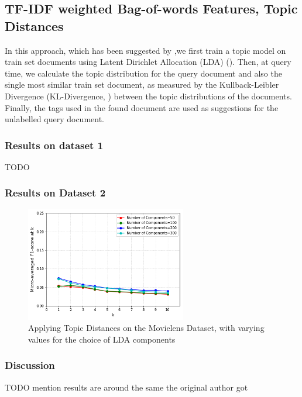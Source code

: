 \subsection{TF-IDF weighted Bag-of-words Features, Topic Distances}

In this approach, which has been suggested by \cite{choubey_2011},we first train a topic model on train set documents using Latent Dirichlet Allocation (LDA) (\cite{blei_etal_2003}). Then, at query time, we calculate the topic distribution for the query document and also the single most similar train set document, as measured by the Kullback-Leibler Divergence (KL-Divergence, \cite{kullback_leibler_1951}) between the topic distributions of the documents. Finally, the tags used in the found document are used as suggestions for the unlabelled query document.

\subsubsection{Results on dataset 1}

{\color{red} TODO}

\subsubsection{Results on Dataset 2}

\begin{figure}[H]
    \centering
    \includegraphics[width=7cm]{chapters/05_experiments/images/movielens-topic-distances.png}
    \caption{Applying Topic Distances on the Movielens Dataset, with varying values for the choice of LDA components}
    \label{fig:ovr_svm_movielens}
\end{figure}

\subsubsection{Discussion}

{\color{red} TODO mention results are around the same the original author got}

